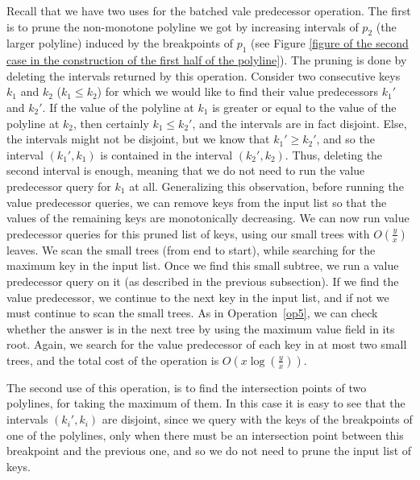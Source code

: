 \documentclass[11pt,a4paper]{article}
\theoremstyle{definition}
\theoremstyle{remark}
\begin{document}
Recall that we have two uses for the batched vale predecessor operation. The first is to prune the non-monotone polyline we got by increasing intervals of $p_2$ (the larger polyline) induced by the breakpoints of $p_1$ (see Figure \ref{figure of the second case in the construction of the first half of the polyline}). The pruning is done by deleting the intervals returned by this operation.
%
 Consider two consecutive keys $k_1$ and $k_2$ ($k_1 \leq k_2$) for which we would like to find their value predecessors $k_1'$ and $k_2'$. If the value of the polyline at $k_1$  is greater or equal to the value  of the polyline at $k_2$, then certainly $k_1 \leq k_2'$, and the intervals are in fact disjoint. Else, the intervals might not be disjoint, but we know that $k_1' \geq k_2'$, and so the interval $(k_1',k_1)$ is contained in the interval $(k_2',k_2)$. Thus, deleting the second interval is enough, meaning that we do not need to run the value predecessor query for $k_1$ at all. Generalizing this observation, before running the value predecessor queries, we can remove keys from the input list %
 so that the values of the remaining keys are  monotonically decreasing. %
We can now run value predecessor queries for this pruned list of keys, using our small trees with $O(\frac{y}{x})$ leaves. We scan the small trees (from end to start), while searching for the maximum key in the input list. Once we find this small subtree, we run a value predecessor query  on it (as described in the previous subsection). 
%
If we find the value predecessor, we continue to the next key in the input list, and if not we must continue to scan the small trees. As in Operation~\ref{op5}, we can check whether the answer is in the next tree by using the maximum value field in its root. Again, we search for the value predecessor of each key in at most two small trees, and the total cost of the operation is $O(x \log (\frac{y}{x}))$.

The second use of this operation, is to find the intersection points of two polylines, for taking the maximum of them. In this case it is easy to see that the intervals $(k_i',k_i)$ are disjoint, since we query with the keys of the breakpoints of one of the polylines, only when there must be an intersection point between this breakpoint and the previous one, and so we do not need to prune the input list of keys.
\end{document}
